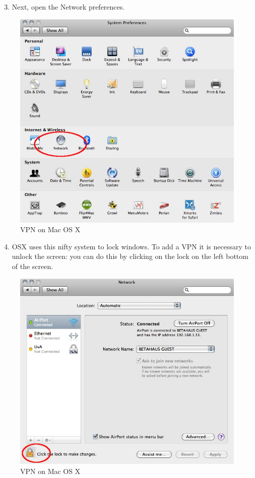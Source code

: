 \begin{enumerate}[1.]
\setcounter{enumi}{2}
\item
  Next, open the Network preferences.
\end{enumerate}
\begin{figure}[htbp]
\centering
\includegraphics{vpn_osx_03.jpg}
\caption{VPN on Mac OS X}
\end{figure}

\begin{enumerate}[1.]
\setcounter{enumi}{3}
\item
  OSX uses this nifty system to lock windows. To add a VPN it is
  necessary to unlock the screen: you can do this by clicking on the
  lock on the left bottom of the screen.
\end{enumerate}
\begin{figure}[htbp]
\centering
\includegraphics{vpn_osx_04.jpg}
\caption{VPN on Mac OS X}
\end{figure}


